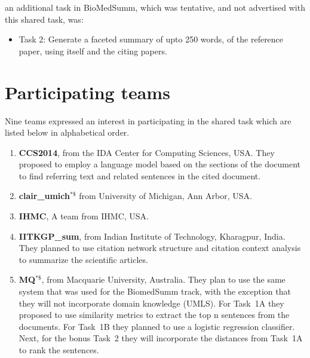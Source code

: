 \documentclass[11pt]{article}
\begin{document}
an additional task in BioMedSumm, which was tentative, and not 
advertised with this shared task, was:
\newpage
\begin{itemize}
\item Task 2: Generate a faceted summary of upto 250 words, of the 
reference paper, using itself and the citing papers.
\end{itemize}
\section{Participating teams}
Nine teams expressed an interest in participating in the shared task
which are listed below in alphabetical order.

\begin{enumerate}
\item{{\bf CCS2014}, from the IDA Center for Computing Sciences,
  USA. They proposed to employ a language model based on the sections
  of the document to find referring text and related sentences in the
  cited document.}
\vspace{-.3cm}
\item{{\bf clair\_umich$^{*\$}$} from University of Michigan, Ann Arbor, USA.}
\vspace{-.3cm}
\item{{\bf IHMC}, A team from IHMC, USA.}
\vspace{-.3cm}
\item{{\bf IITKGP\_sum}, from Indian Institute of Technology,
  Kharagpur, India. They planned to use citation network structure and
  citation context analysis to summarize the scientific articles.}
\vspace{-.3cm}
\item{{\bf MQ$^{*\$}$}, from Macquarie University, Australia. They
  plan to use the same system that was used for the BiomedSumm track,
  with the exception that they will not incorporate domain knowledge
  (UMLS). For Task~1A they proposed to use similarity metrics to extract the
  top n sentences from the documents. For Task~1B they planned to use a
  logistic regression classifier. Next, for the bonus Task~2 they will 
  incorporate the distances from Task~1A to rank the sentences.
  }


\end{enumerate}
\end{document}
